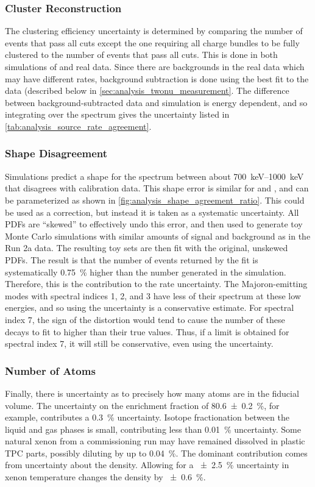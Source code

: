 \documentclass[herrin-thesis.tex]{subfiles}
\begin{document}
\subsubsection{Cluster Reconstruction}
The clustering efficiency uncertainty is determined by comparing the number of events that pass all cuts except the one requiring all charge bundles to be fully clustered to the number of events that pass all cuts. This is done in both simulations of \twonu{} and real data. Since there are backgrounds in the real data which may have different rates, background subtraction is done using the best fit to the data (described below in \cref{sec:analysis_twonu_measurement}. The difference between background-subtracted data and simulation is energy dependent, and so integrating over the \twonu{} spectrum gives the uncertainty listed in \cref{tab:analysis_source_rate_agreement}.

\subsubsection{Shape Disagreement}
Simulations predict a shape for the spectrum between about \SIrange{700}{1000}{\keV} that disagrees with calibration data. This shape error is similar for  and , and can be parameterized as shown in \cref{fig:analysis_shape_agreement_ratio}. This could be used as a correction, but instead it is taken as a systematic uncertainty. All PDFs are ``skewed'' to effectively undo this error, and then used to generate toy Monte Carlo simulations with similar amounts of signal and background as in the Run 2a data. The resulting toy sets are then fit with the original, unskewed PDFs. The result is that the number of \twonu{} events returned by the fit is systematically \SI{0.75}{\percent} higher than the number generated in the simulation. Therefore, this is the contribution to the \twonu{} rate uncertainty. The Majoron-emitting modes with spectral indices 1, 2, and 3 have less of their spectrum at these low energies, and so using the \twonu{} uncertainty is a conservative estimate. For spectral index 7, the sign of the distortion would tend to cause the number of these decays to fit to higher than their true values. Thus, if a limit is obtained for spectral index 7, it will still be conservative, even using the \twonu{} uncertainty.

\subsubsection{Number of \texorpdfstring{}{Xenon-136} Atoms}
Finally, there is uncertainty as to precisely how many  atoms are in the fiducial volume. The uncertainty on the enrichment fraction of \SI{80.6\pm0.2}{\percent}, for example, contributes a \SI{0.3}{\percent} uncertainty. Isotope fractionation between the liquid and gas phases is small, contributing less than \SI{0.01}{\percent} uncertainty. Some natural xenon from a commissioning run may have remained dissolved in plastic TPC parts, possibly diluting  by up to \SI{0.04}{\percent}. The dominant contribution comes from uncertainty about the density. Allowing for a \SI{\pm2.5}{\percent} uncertainty in xenon temperature changes the density by \SI{\pm0.6}{\percent}.
\end{document}
